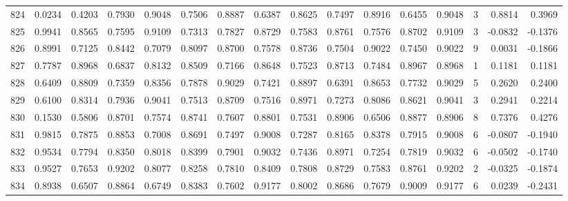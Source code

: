 \begin{tabular}{lrrrrrrrrrrrrrrr}
824 &      0.0234 &  0.4203 &  0.7930 &  0.9048 &  0.7506 &  0.8887 &  0.6387 &  0.8625 &  0.7497 &  0.8916 &   0.6455 &     0.9048 &      3 &                    0.8814 &                     0.3969 \\
825 &      0.9941 &  0.8565 &  0.7595 &  0.9109 &  0.7313 &  0.7827 &  0.8729 &  0.7583 &  0.8761 &  0.7576 &   0.8702 &     0.9109 &      3 &                   -0.0832 &                    -0.1376 \\
826 &      0.8991 &  0.7125 &  0.8442 &  0.7079 &  0.8097 &  0.8700 &  0.7578 &  0.8736 &  0.7504 &  0.9022 &   0.7450 &     0.9022 &      9 &                    0.0031 &                    -0.1866 \\
827 &      0.7787 &  0.8968 &  0.6837 &  0.8132 &  0.8509 &  0.7166 &  0.8648 &  0.7523 &  0.8713 &  0.7484 &   0.8967 &     0.8968 &      1 &                    0.1181 &                     0.1181 \\
828 &      0.6409 &  0.8809 &  0.7359 &  0.8356 &  0.7878 &  0.9029 &  0.7421 &  0.8897 &  0.6391 &  0.8653 &   0.7732 &     0.9029 &      5 &                    0.2620 &                     0.2400 \\
829 &      0.6100 &  0.8314 &  0.7936 &  0.9041 &  0.7513 &  0.8709 &  0.7516 &  0.8971 &  0.7273 &  0.8086 &   0.8621 &     0.9041 &      3 &                    0.2941 &                     0.2214 \\
830 &      0.1530 &  0.5806 &  0.8701 &  0.7574 &  0.8741 &  0.7607 &  0.8801 &  0.7531 &  0.8906 &  0.6506 &   0.8877 &     0.8906 &      8 &                    0.7376 &                     0.4276 \\
831 &      0.9815 &  0.7875 &  0.8853 &  0.7008 &  0.8691 &  0.7497 &  0.9008 &  0.7287 &  0.8165 &  0.8378 &   0.7915 &     0.9008 &      6 &                   -0.0807 &                    -0.1940 \\
832 &      0.9534 &  0.7794 &  0.8350 &  0.8018 &  0.8399 &  0.7901 &  0.9032 &  0.7436 &  0.8971 &  0.7254 &   0.7819 &     0.9032 &      6 &                   -0.0502 &                    -0.1740 \\
833 &      0.9527 &  0.7653 &  0.9202 &  0.8077 &  0.8258 &  0.7810 &  0.8409 &  0.7808 &  0.8729 &  0.7583 &   0.8761 &     0.9202 &      2 &                   -0.0325 &                    -0.1874 \\
834 &      0.8938 &  0.6507 &  0.8864 &  0.6749 &  0.8383 &  0.7602 &  0.9177 &  0.8002 &  0.8686 &  0.7679 &   0.9009 &     0.9177 &      6 &                    0.0239 &                    -0.2431 \\

\end{tabular}
